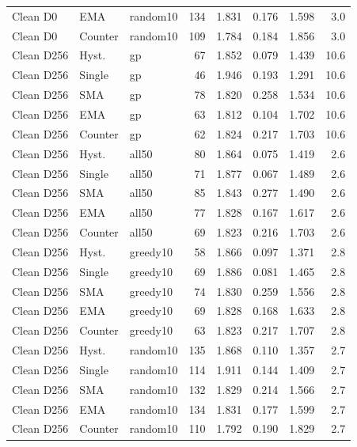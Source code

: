 {\begin{longtable}{lllrrrrr}
Clean D0 & EMA & random10 & 134 & 1.831 & 0.176 & 1.598 & 3.0\\
Clean D0 & Counter & random10 & 109 & 1.784 & 0.184 & 1.856 & 3.0\\
Clean D256 & Hyst. & gp & 67 & 1.852 & 0.079 & 1.439 & 10.6\\
Clean D256 & Single & gp & 46 & 1.946 & 0.193 & 1.291 & 10.6\\
Clean D256 & SMA & gp & 78 & 1.820 & 0.258 & 1.534 & 10.6\\
Clean D256 & EMA & gp & 63 & 1.812 & 0.104 & 1.702 & 10.6\\
Clean D256 & Counter & gp & 62 & 1.824 & 0.217 & 1.703 & 10.6\\
Clean D256 & Hyst. & all50 & 80 & 1.864 & 0.075 & 1.419 & 2.6\\
Clean D256 & Single & all50 & 71 & 1.877 & 0.067 & 1.489 & 2.6\\
Clean D256 & SMA & all50 & 85 & 1.843 & 0.277 & 1.490 & 2.6\\
Clean D256 & EMA & all50 & 77 & 1.828 & 0.167 & 1.617 & 2.6\\
Clean D256 & Counter & all50 & 69 & 1.823 & 0.216 & 1.703 & 2.6\\
Clean D256 & Hyst. & greedy10 & 58 & 1.866 & 0.097 & 1.371 & 2.8\\
Clean D256 & Single & greedy10 & 69 & 1.886 & 0.081 & 1.465 & 2.8\\
Clean D256 & SMA & greedy10 & 74 & 1.830 & 0.259 & 1.556 & 2.8\\
Clean D256 & EMA & greedy10 & 69 & 1.828 & 0.168 & 1.633 & 2.8\\
Clean D256 & Counter & greedy10 & 63 & 1.823 & 0.217 & 1.707 & 2.8\\
Clean D256 & Hyst. & random10 & 135 & 1.868 & 0.110 & 1.357 & 2.7\\
Clean D256 & Single & random10 & 114 & 1.911 & 0.144 & 1.409 & 2.7\\
Clean D256 & SMA & random10 & 132 & 1.829 & 0.214 & 1.566 & 2.7\\
Clean D256 & EMA & random10 & 134 & 1.831 & 0.177 & 1.599 & 2.7\\
Clean D256 & Counter & random10 & 110 & 1.792 & 0.190 & 1.829 & 2.7\\
\end{longtable}}
\par\medskip

